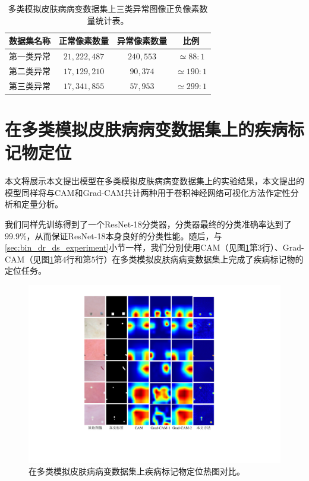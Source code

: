 \begin{table}[h]
	\centering
	\caption[多类模拟皮肤病病变数据集上三类异常图像正负像素数量统计表]{多类模拟皮肤病病变数据集上三类异常图像正负像素数量统计表。}
	\label{tab:multi_ds_pixel_freqs}
	\begin{tabular}{c|c|c|c}
		\toprule[2pt]
		数据集名称 & 正常像素数量 & 异常像素数量 & 比例 \\
		\midrule[2pt]
		第一类异常&  $21,222,487$ & $240,553$ & $\simeq 88: 1$ \\ \hline
		第二类异常&  $17,129,210$ & $90,374$ & $\simeq 190: 1$ \\ \hline
		第三类异常 & $17,341,855$ & $57,953$ & $\simeq 299: 1$ \\
		\bottomrule[2pt]
	\end{tabular}
\end{table}
\section{在多类模拟皮肤病病变数据集上的疾病标记物定位}\label{sec:multi_classes_experiments_res}
本文将展示本文提出模型在多类模拟皮肤病病变数据集上的实验结果，本文提出的模型同样将与CAM和Grad-CAM共计两种用于卷积神经网络可视化方法作定性分析和定量分析。

我们同样先训练得到了一个ResNet-18分类器，分类器最终的分类准确率达到了$99.9\%$，从而保证ResNet-18本身良好的分类性能。随后，与\ref{sec:bin_dr_ds_experiment}小节一样，我们分别使用CAM（见图\ref{fig:multi_simulated_skin_res}第$3$行）、Grad-CAM（见图\ref{fig:multi_simulated_skin_res}第$4$行和第$5$行）在多类模拟皮肤病病变数据集上完成了疾病标记物的定位任务。
\begin{figure}[h]
	\centering
	\includegraphics[width=1.0\textwidth]{figure/multi_simulated_skin_res.pdf}
	\caption[在多类模拟皮肤病病变数据集上疾病标记物定位热图对比]{在多类模拟皮肤病病变数据集上疾病标记物定位热图对比。}
	\label{fig:multi_simulated_skin_res}
\end{figure}

